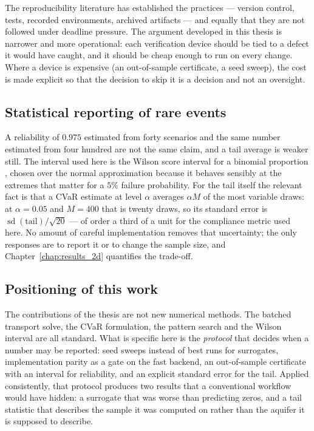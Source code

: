 \documentclass[11pt]{article}
\begin{document}
The reproducibility literature \citep{sandve2013ten,wilson2014best} has
established the practices --- version control, tests, recorded environments,
archived artifacts --- and equally that they are not followed under deadline
pressure. The argument developed in this thesis is narrower and more operational:
each verification device should be tied to a defect it would have caught, and it
should be cheap enough to run on every change. Where a device is expensive (an
out-of-sample certificate, a seed sweep), the cost is made explicit so that the
decision to skip it is a decision and not an oversight.

\subsection{Statistical reporting of rare events}

A reliability of $0.975$ estimated from forty scenarios and the same number
estimated from four hundred are not the same claim, and a tail average is weaker
still. The interval used here is the Wilson score interval for a binomial
proportion \citep{wilson1927probable}, chosen over the normal approximation
because it behaves sensibly at the extremes that matter for a $5\%$ failure
probability. For the tail itself the relevant fact is that a CVaR estimate at
level $\alpha$ averages $\alpha M$ of the most variable draws: at
$\alpha = 0.05$ and $M = 400$ that is twenty draws, so its standard error is
$\operatorname{sd}(\text{tail})/\sqrt{20}$ --- of order a third of a unit for the
compliance metric used here. No amount of careful implementation removes that
uncertainty; the only responses are to report it or to change the sample size,
and Chapter~\ref{chap:results_2d} quantifies the trade-off.

\subsection{Positioning of this work}

The contributions of the thesis are not new numerical methods. The batched
transport solve, the CVaR formulation, the pattern search and the Wilson interval
are all standard. What is specific here is the \emph{protocol} that decides when a
number may be reported: seed sweeps instead of best runs for surrogates,
implementation parity as a gate on the fast backend, an out-of-sample
certificate with an interval for reliability, and an explicit standard error for
the tail. Applied consistently, that protocol produces two results that a
conventional workflow would have hidden: a surrogate that was worse than
predicting zeros, and a tail statistic that describes the sample it was computed
on rather than the aquifer it is supposed to describe.
\end{document}

